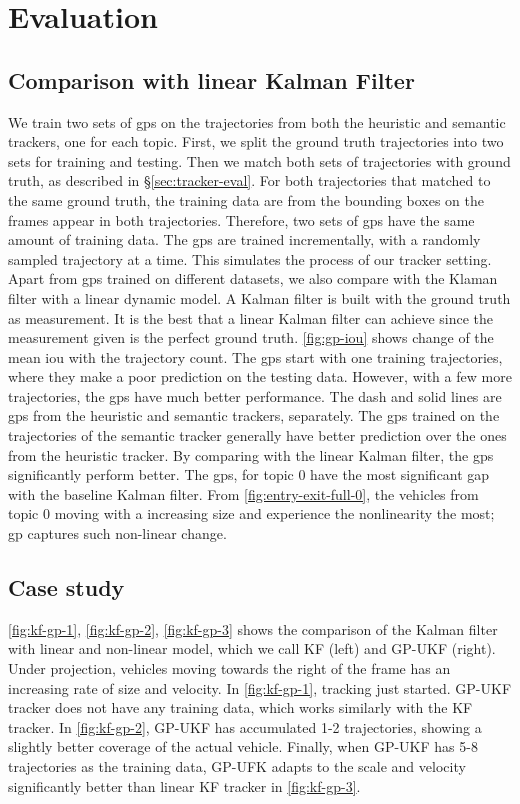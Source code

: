 \section{Evaluation}

\subsection{Comparison with linear Kalman Filter}
We train two sets of \gls{gp}s on the trajectories from both the heuristic and semantic trackers, one for each topic.
First, we split the ground truth trajectories into two sets for training and testing.
Then we match both sets of trajectories with ground truth, as described in \S\ref{sec:tracker-eval}. 
For both trajectories that matched to the same ground truth, the training data are from the bounding boxes on the frames appear in both trajectories.
Therefore, two sets of \gls{gp}s have the same amount of training data. 
The \gls{gp}s are trained incrementally, with a randomly sampled trajectory at a time.
This simulates the process of our tracker setting.
Apart from \gls{gp}s trained on different datasets, we also compare with the Klaman filter with a linear dynamic model.
A Kalman filter is built with the ground truth as measurement. 
It is the best that a linear Kalman filter can achieve since the measurement given is the perfect ground truth.
\ref{fig:gp-iou} shows change of the mean \gls{iou} with the trajectory count.
The \gls{gp}s start with one training trajectories, where they make a poor prediction on the testing data.
However, with a few more trajectories, the \gls{gp}s have much better performance.
The dash and solid lines are \gls{gp}s from the heuristic and semantic trackers, separately. 
The \gls{gp}s trained on the trajectories of the semantic tracker generally have better prediction over the ones from the heuristic tracker.
By comparing with the linear Kalman filter, the \gls{gp}s significantly perform better.
The \gls{gp}s, for topic 0 have the most significant gap with the baseline Kalman filter. 
From \ref{fig:entry-exit-full-0}, the vehicles from topic 0 moving with a increasing size and experience the nonlinearity the most; \gls{gp} captures such non-linear change.


\subsection{Case study}
\ref{fig:kf-gp-1}, \ref{fig:kf-gp-2}, \ref{fig:kf-gp-3} shows the comparison of the Kalman filter with linear and non-linear model, which we call KF (left) and GP-UKF (right). Under projection, vehicles moving towards the right of the frame has an increasing rate of size and velocity. 
In \ref{fig:kf-gp-1}, tracking just started. GP-UKF tracker does not have any training data, which works similarly with the KF tracker. 
In \ref{fig:kf-gp-2}, GP-UKF has accumulated 1-2 trajectories, showing a slightly better coverage of the actual vehicle. 
Finally, when GP-UKF has 5-8 trajectories as the training data, GP-UFK adapts to the scale and velocity significantly better than linear KF tracker in \ref{fig:kf-gp-3}.

